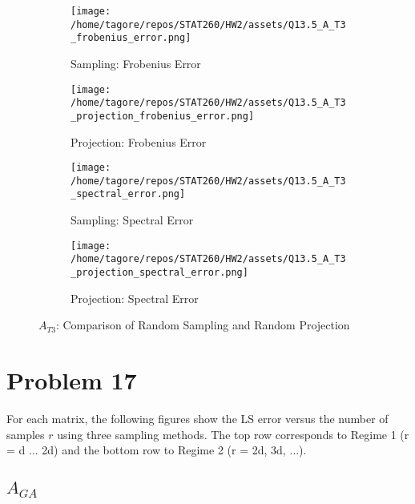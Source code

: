 \documentclass{article}
\begin{document}
\begin{figure}[H]
    \centering
    \begin{subfigure}[b]{0.48\textwidth}
        \centering
        \texttt{[image: /home/tagore/repos/STAT260/HW2/assets/Q13.5\_A\_T3\_frobenius\_error.png]}
        \caption{Sampling: Frobenius Error}
        \label{fig:T3_fs}
    \end{subfigure}
    \hfill
    \begin{subfigure}[b]{0.48\textwidth}
        \centering
        \texttt{[image: /home/tagore/repos/STAT260/HW2/assets/Q13.5\_A\_T3\_projection\_frobenius\_error.png]}
        \caption{Projection: Frobenius Error}
        \label{fig:T3_fp}
    \end{subfigure}
    
    \vspace{0.5cm}
    
    \begin{subfigure}[b]{0.48\textwidth}
        \centering
        \texttt{[image: /home/tagore/repos/STAT260/HW2/assets/Q13.5\_A\_T3\_spectral\_error.png]}
        \caption{Sampling: Spectral Error}
        \label{fig:T3_ss}
    \end{subfigure}
    \hfill
    \begin{subfigure}[b]{0.48\textwidth}
        \centering
        \texttt{[image: /home/tagore/repos/STAT260/HW2/assets/Q13.5\_A\_T3\_projection\_spectral\_error.png]}
        \caption{Projection: Spectral Error}
        \label{fig:T3_sp}
    \end{subfigure}
    
    \caption{\(A_{T3}\): Comparison of Random Sampling and Random Projection}
    \label{fig:T3_comparison}
\end{figure}


\section*{Problem 17}

For each matrix, the following figures show the LS error versus the number of samples \(r\) using three sampling methods. The top row corresponds to Regime 1 (r = d ... 2d) and the bottom row to Regime 2 (r = 2d, 3d, \(\ldots\)).

\subsection*{\(A_{GA}\)}
\end{document}
